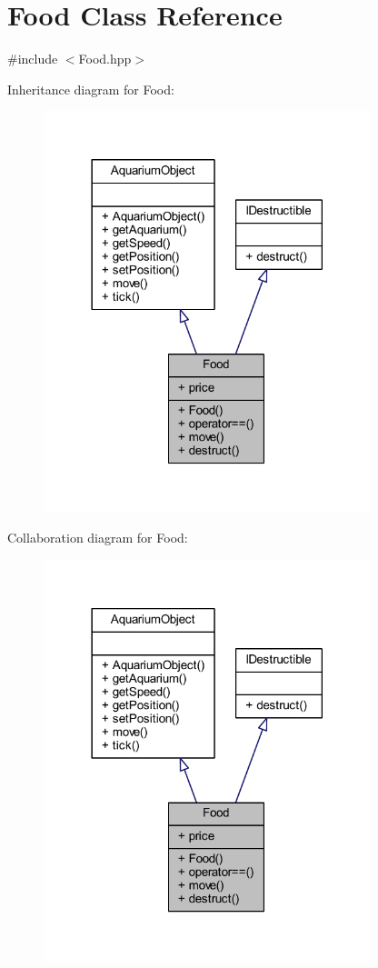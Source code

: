 \hypertarget{class_food}{}\section{Food Class Reference}
\label{class_food}


{\ttfamily \#include $<$Food.\+hpp$>$}



Inheritance diagram for Food\+:\nopagebreak
\begin{figure}[H]
\begin{center}
\leavevmode
\includegraphics[width=270pt]{class_food__inherit__graph}
\end{center}
\end{figure}


Collaboration diagram for Food\+:\nopagebreak
\begin{figure}[H]
\begin{center}
\leavevmode
\includegraphics[width=270pt]{class_food__coll__graph}
\end{center}
\end{figure}
